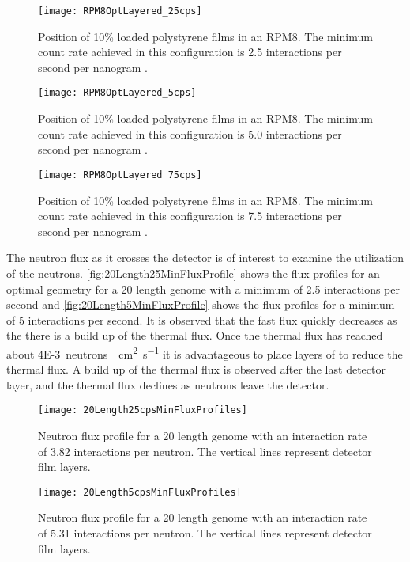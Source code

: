 \begin{figure}
  \centering
  \texttt{[image: RPM8OptLayered\_25cps]}
  \caption[Position of Films in Optimized Layered RPM8 (2.5 interactions per nanogram Cf-252)]{Position of 10\%  loaded polystyrene films in  an RPM8. The minimum count rate achieved in this configuration is 2.5 interactions per second per nanogram .}
  \label{fig:RPMLayeredRendering25}
\end{figure}
\begin{figure}
  \centering
  \texttt{[image: RPM8OptLayered\_5cps]}
  \caption[Position of Films in Optimized Layered RPM8 (5.0 interactions per nanogram Cf-252)]{Position of 10\%  loaded polystyrene films in  an RPM8. The minimum count rate achieved in this configuration is 5.0 interactions per second per nanogram .}
  \label{fig:RPMLayeredRendering5}
\end{figure}
\begin{figure}
  \centering
  \texttt{[image: RPM8OptLayered\_75cps]}
  \caption[Position of Films in Optimized Layered RPM8 (7.5 interactions per nanogram Cf-252)]{Position of 10\%  loaded polystyrene films in  an RPM8. The minimum count rate achieved in this configuration is 7.5 interactions per second per nanogram .}
  \label{fig:RPMLayeredRendering75}
\end{figure}

The neutron flux as it crosses the detector is of interest to examine the utilization of the neutrons.
\autoref{fig:20Length25MinFluxProfile} shows the flux profiles for an optimal geometry for a 20 length genome with a minimum of 2.5 interactions per second and \autoref{fig:20Length5MinFluxProfile} shows the flux profiles for a minimum of 5 interactions per second.
It is observed that the fast flux quickly decreases as the there is a build up of the thermal flux.
Once the thermal flux has reached about \SI{4E-3}{neutrons \per \cm\squared \per\second} it is advantageous to place layers of  to reduce the thermal flux.
A build up of the thermal flux is observed after the last detector layer, and the thermal flux declines as neutrons leave the detector.
\begin{figure}
	\centering
	\texttt{[image: 20Length25cpsMinFluxProfiles]}
	\caption[Neutron Flux Profile for an Optimal 20 Length Genome, minimum 2.5 interactions per second]{Neutron flux profile for a 20 length genome with an interaction rate of 3.82 interactions per neutron. The vertical lines represent detector film layers.}
	\label{fig:20Length25MinFluxProfile}
\end{figure}
\begin{figure}
	\centering
	\texttt{[image: 20Length5cpsMinFluxProfiles]}
	\caption[Neutron Flux Profile for an Optimal 20 Length Genome, minimum 5 interactions per second]{Neutron flux profile for a 20 length genome with an interaction rate of 5.31 interactions per neutron. The vertical lines represent detector film layers.}
	\label{fig:20Length5MinFluxProfile}
\end{figure}

